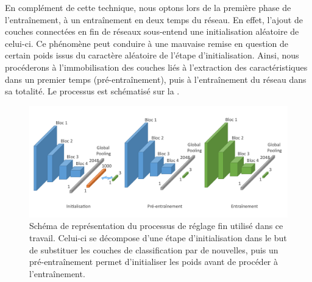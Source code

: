 En complément de cette technique, nous optons lors de la première phase de l'entraînement, à un entraînement en deux temps du réseau. En effet, l'ajout de couches connectées en fin de réseaux sous-entend une initialisation aléatoire de celui-ci. Ce phénomène peut conduire à une mauvaise remise en question de certain poids issus du caractère aléatoire de l'étape d'initialisation. Ainsi, nous procéderons à l'immobilisation des couches liés à l'extraction des caractéristiques dans un premier temps (pré-entraînement), puis à l'entraînement du réseau dans sa totalité. Le processus est schématisé sur la .\par

\begin{figure}[H]
    \centering
    \includegraphics[width=\linewidth]{contents/chapter_5/resources/scheme_image_improvement_image_fine_tune.pdf}
    \caption{Schéma de représentation du processus de réglage fin utilisé dans ce travail. Celui-ci se décompose d'une étape d'initialisation dans le but de substituer les couches de classification par de nouvelles, puis un pré-entraînement permet d'initialiser les poids avant de procéder à l'entraînement.}
    \label{fig:scheme_image_fine_tune}
\end{figure}\par

